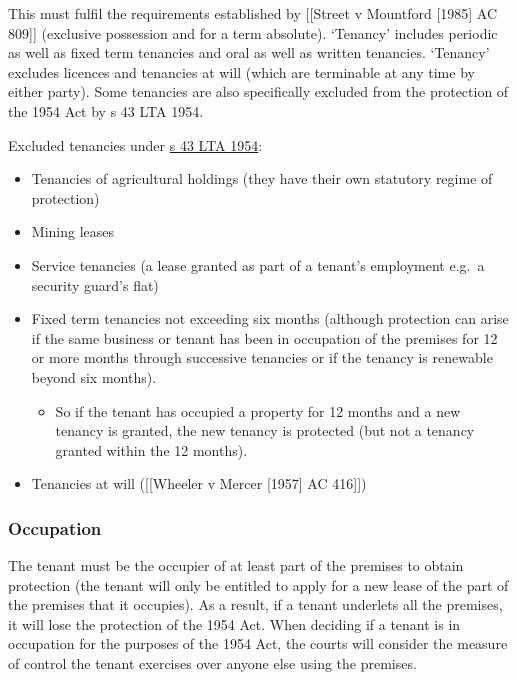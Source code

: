 \documentclass[
]{article}
\providecommand{\tightlist}{%
  \setlength{\itemsep}{0pt}\setlength{\parskip}{0pt}}
\begin{document}
This must fulfil the requirements established by {[}{[}Street v
Mountford {[}1985{]} AC 809{]}{]} (exclusive possession and for a term
absolute). `Tenancy' includes periodic as well as fixed term tenancies
and oral as well as written tenancies. `Tenancy' excludes licences and
tenancies at will (which are terminable at any time by either party).
Some tenancies are also specifically excluded from the protection of the
1954 Act by s 43 LTA 1954.

Excluded tenancies under
\href{https://www.legislation.gov.uk/ukpga/Eliz2/2-3/56/section/43}{s 43
LTA 1954}:

\begin{itemize}
\tightlist
\item
  Tenancies of agricultural holdings (they have their own statutory
  regime of protection)
\item
  Mining leases
\item
  Service tenancies (a lease granted as part of a tenant's employment
  e.g.~a security guard's flat)
\item
  Fixed term tenancies not exceeding six months (although protection can
  arise if the same business or tenant has been in occupation of the
  premises for 12 or more months through successive tenancies or if the
  tenancy is renewable beyond six months).

  \begin{itemize}
  \tightlist
  \item
    So if the tenant has occupied a property for 12 months and a new
    tenancy is granted, the new tenancy is protected (but not a tenancy
    granted within the 12 months).
  \end{itemize}
\item
  Tenancies at will ({[}{[}Wheeler v Mercer {[}1957{]} AC 416{]}{]})
\end{itemize}

\hypertarget{occupation}{%
\subsubsection{Occupation}\label{occupation}}

The tenant must be the occupier of at least part of the premises to
obtain protection (the tenant will only be entitled to apply for a new
lease of the part of the premises that it occupies). As a result, if a
tenant underlets all the premises, it will lose the protection of the
1954 Act. When deciding if a tenant is in occupation for the purposes of
the 1954 Act, the courts will consider the measure of control the tenant
exercises over anyone else using the premises.
\end{document}
